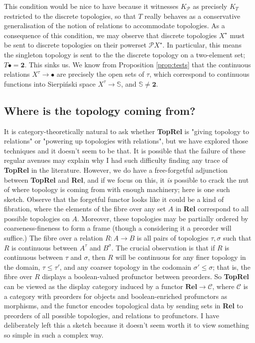 \begin{fullwidth}
This condition would be nice to have because it witnesses $K_{\mathcal{P}}$ as precisely $K_T$ restricted to the discrete topologies, so that $T$ really behaves as a conservative generalisation of the notion of relations to accommodate topologies. As a consequence of this condition, we may observe that discrete topologies $X^\star$ must be sent to discrete topologies on their powerset $\mathcal{P}X^\star$. In particular, this means the singleton topology is sent to the the discrete topology on a two-element set; $T\bullet = \textbf{2}$. This sinks us. We know from Proposition \ref{prop:tests} that the continuous relations $X^\tau \rightarrow \bullet$ are precisely the open sets of $\tau$, which correspond to continuous functions into Sierpi\'{n}ski space $X^\tau \rightarrow \mathbb{S}$, and $\mathbb{S} \neq \textbf{2}$.

\subsection{Where is the topology coming from?}

It is category-theoretically natural to ask whether \textbf{TopRel} is "giving topology to relations" or "powering up topologies with relations", but we have explored those techniques and it doesn't seem to be that. It is possible that the failure of these regular avenues may explain why I had such difficulty finding any trace of \textbf{TopRel} in the literature. However, we do have a free-forgetful adjunction between \textbf{TopRel} and \textbf{Rel}, and if we focus on this, it \emph{is} possible to crack the nut of where topology is coming from with enough machinery; here is one such sketch. Observe that the forgetful functor looks like it could be a kind of fibration, where the elements of the fibre over any set $A$ in \textbf{Rel} correspond to all possible topologies on $A$. Moreover, these topologies may be partially ordered by coarseness-fineness to form a frame (though a considering it a preorder will suffice.) The fibre over a relation $R: A \rightarrow B$ is all pairs of topologies $\tau, \sigma$ such that $R$ is continuous between $A^\tau$ and $B^\sigma$. The crucial observation is that if $R$ is continuous between $\tau$ and $\sigma$, then $R$ will be continuous for any finer topology in the domain, $\tau \leq \tau'$, and any coarser topology in the codomain $\sigma' \leq \sigma$; that is, the fibre over $R$ displays a boolean-valued profunctor between preorders. So \textbf{TopRel} can be viewed as the display category induced by a functor $\textbf{Rel} \rightarrow \mathcal{C}$, where $\mathcal{C}$ is a category with preorders for objects and boolean-enriched profunctors as morphisms, and the functor encodes topological data by sending sets in \textbf{Rel} to preorders of all possible topologies, and relations to profunctors. I have deliberately left this a sketch because it doesn't seem worth it to view something so simple in such a complex way.


\end{fullwidth}
